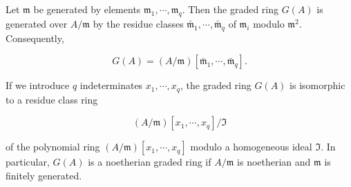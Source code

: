 Let $\mathfrak{m}$ be generated by elements $\mathfrak{m}_1, \cdots, \mathfrak{m}_q$. Then the graded ring $G(A)$ is generated over $A/\mathfrak{m}$ by the residue classes $\bar{\mathfrak{m}}_1, \cdots, \bar{\mathfrak{m}}_q$ of $\mathfrak{m}_i$ modulo $\mathfrak{m}^2$. Consequently,

$$G(A) = (A/\mathfrak{m})[\bar{\mathfrak{m}}_1, \cdots, \bar{\mathfrak{m}}_q].$$

If we introduce $q$ indeterminates $x_1, \cdots, x_q$, the graded ring $G(A)$ is isomorphic to a residue class ring

$$(A/\mathfrak{m})[x_1, \cdots, x_q] / \mathfrak{I}$$

of the polynomial ring $(A/\mathfrak{m})[x_1, \cdots, x_q]$ modulo a homogeneous ideal $\mathfrak{I}$. In particular, $G(A)$ is a noetherian graded ring if $A/\mathfrak{m}$ is noetherian and $\mathfrak{m}$ is finitely generated.
